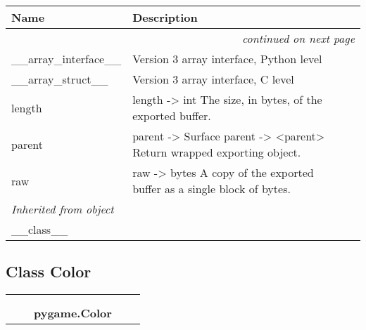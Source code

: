     \vspace{-1cm}
\hspace{\varindent}\begin{longtable}{|p{\varnamewidth}|p{\vardescrwidth}|l}
\cline{1-2}
\cline{1-2} \centering \textbf{Name} & \centering \textbf{Description}& \\
\cline{1-2}
\endhead\cline{1-2}\multicolumn{3}{r}{\small\textit{continued on next page}}\\\endfoot\cline{1-2}
\endlastfoot\raggedright \_\-\_\-a\-r\-r\-a\-y\-\_\-i\-n\-t\-e\-r\-f\-a\-c\-e\-\_\-\_\- & \raggedright Version 3 array interface, Python level&\\
\cline{1-2}
\raggedright \_\-\_\-a\-r\-r\-a\-y\-\_\-s\-t\-r\-u\-c\-t\-\_\-\_\- & \raggedright Version 3 array interface, C level&\\
\cline{1-2}
\raggedright l\-e\-n\-g\-t\-h\- & \raggedright length -{\textgreater} int The size, in bytes, of the exported 
          buffer.&\\
\cline{1-2}
\raggedright p\-a\-r\-e\-n\-t\- & \raggedright parent -{\textgreater} Surface parent -{\textgreater} 
          {\textless}parent{\textgreater} Return wrapped exporting object.&\\
\cline{1-2}
\raggedright r\-a\-w\- & \raggedright raw -{\textgreater} bytes A copy of the exported buffer as a 
          single block of bytes.&\\
\cline{1-2}
\multicolumn{2}{|l|}{\textit{Inherited from object}}\\
\multicolumn{2}{|p{\varwidth}|}{\raggedright \_\_class\_\_}\\
\cline{1-2}
\end{longtable}



\subsection{Class Color}

    \label{pygame:Color}
\begin{tabular}{cccccc}
\multicolumn{2}{r}{\settowidth{\BCL}{object}\multirow{2}{\BCL}{object}}
&&
  \\\cline{3-3}
  &&\multicolumn{1}{c|}{}
&&
  \\
&&\multicolumn{2}{l}{\textbf{pygame.Color}}
\end{tabular}

